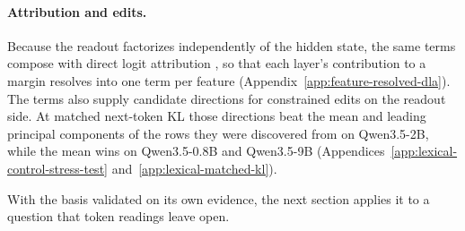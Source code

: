 \paragraph{Attribution and edits.}
Because the readout factorizes independently of the hidden state, the
same terms compose with direct logit attribution
\citep{elhage2021framework,wang2022ioi,nguyen2024logitprisms}, so that
each layer's contribution to a margin resolves into one term per
feature (Appendix~\ref{app:feature-resolved-dla}). The terms also
supply candidate directions for constrained edits on the readout side.
At matched next-token KL those directions beat the mean and leading
principal components of the rows they were discovered from on
Qwen3.5-2B, while the mean wins on Qwen3.5-0.8B and Qwen3.5-9B
(Appendices~\ref{app:lexical-control-stress-test}
and~\ref{app:lexical-matched-kl}).

With the basis validated on its own evidence, the next section applies it to
a question that token readings leave open.

\FloatBarrier
